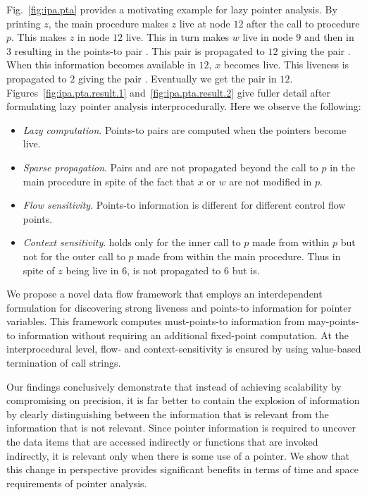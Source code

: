 \documentclass{llncs}
\newcommand{\pt}[2]{\text{$(#1,#2)$}}
\begin{document}
Fig.~\ref{fig:ipa.pta} provides a motivating example for lazy pointer
analysis.
By printing $z$, the main procedure makes $z$ live at node $12$
after the call to procedure $p$.
This makes $z$ in node $12$ live. This in turn
makes $w$ live in node $9$ and then in $3$ resulting in
the points-to pair \pt{w}{x}. This pair is propagated to $12$
giving the pair \pt{z}{x}. When this information becomes available
in $12$, $x$ becomes live. This liveness is propagated to $2$
giving the pair \pt{x}{y}. Eventually we get the pair \pt{z}{y}
in $12$.
Figures~\ref{fig:ipa.pta.result.1} and~\ref{fig:ipa.pta.result.2} give
fuller detail after formulating lazy pointer analysis interprocedurally.
Here we observe the following:
\begin{itemize}
\item {\em Lazy computation}. Points-to pairs are computed when the
      pointers become live.
\item {\em Sparse propagation}. Pairs \pt{x}{y} and \pt{w}{x} are not 
      propagated beyond the call to $p$ in the main procedure in spite of 
      the fact that $x$ or $w$ are not modified in $p$.
\item {\em Flow sensitivity}. Points-to information is different for
      different control flow points.
\item {\em Context sensitivity}. \pt{z}{x} holds only for the inner call to $p$
      made from within $p$ but not for the outer call to $p$ made from within the
      main procedure. Thus in spite of $z$ being live in $6$, 
      \pt{z}{x} is not propagated to $6$ but \pt{z}{y} is.
\end{itemize}

We propose a novel data flow framework that employs an
interdependent formulation for discovering strong liveness and
points-to information for pointer variables. This framework computes
must-points-to information from may-points-to information without
requiring an additional fixed-point computation. At the interprocedural
level, flow- and context-sensitivity is ensured by using value-based
termination of call strings. 


Our findings conclusively demonstrate that instead of achieving scalability
by compromising on precision, it is far better to contain the explosion
of information by clearly distinguishing between the information that
is relevant from the information that is not relevant. Since pointer
information is required to uncover the data items that are accessed
indirectly or functions that are invoked indirectly, it is relevant
only when there is some use of a pointer. We show that this change in
perspective provides significant benefits in terms of time and space
requirements of pointer analysis.
\end{document}
